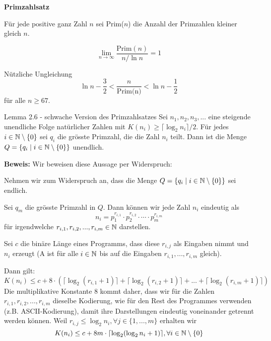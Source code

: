     \textbf{Primzahlsatz}

    Für jede positive ganz Zahl $n$ sei Prim($n$) die Anzahl der Primzahlen kleiner gleich $n$. 
    \begin{mainbox}{}
        $$\lim_{n \to \infty}\frac{\text{Prim}(n)}{n/\ln n} = 1$$
    \end{mainbox}
    Nützliche Ungleichung
    $$\ln n - \frac{3}{2} < \frac{n}{\text{Prim(n)}} < \ln n - \frac{1}{2}$$
    für alle $n \geq 67$.

    \begin{mainbox}{Lemma 2.6 - schwache Version des Primzahlsatzes}
        Sei $n_1, n_2, n_3, ...$ eine steigende unendliche Folge natürlicher Zahlen mit $K(n_i) \geq \lceil \log_2 n_i \rceil / 2$. Für jedes $i \in \mathbb{N} \setminus \{0\}$ sei $q_i$ die grösste Primzahl, die die Zahl $n_i$ teilt. Dann ist die Menge $Q = \{q_i \mid i \in \mathbb{N} \setminus\{0\}\}$ unendlich.
    \end{mainbox}
    \textbf{Beweis: }
    Wir beweisen diese Aussage per Widerspruch:

    Nehmen wir zum Widerspruch an, dass die Menge $Q = \{q_i \mid i \in \mathbb{N} \setminus \{0\}\}$ sei endlich. 
    
    Sei $q_m$ die grösste Primzahl in $Q$. Dann können wir jede Zahl $n_i$ eindeutig als 
    $$n_i = p_1^{r_{i, 1}} \cdot p_2^{r_{i,2}} \cdot \cdots \cdot p_m^{r_{i,m}}$$
    für irgendwelche $r_{i,1}, r_{i,2}, ..., r_{i,m} \in \mathbb{N}$ darstellen. 
    
    
    Sei $c$ die binäre Länge eines Programms, dass diese $r_{i,j}$ als Eingaben nimmt und $n_i$ erzeugt (A ist für alle $i\in \mathbb{N}$ bis auf die Eingaben $r_{i,1}, ..., r_{i,m}$ gleich).
    
    Dann gilt:
    $$K(n_i) \leq c + 8 \cdot (\lceil \log_2(r_{i,1}+1)\rceil + \lceil \log_2(r_{i,2}+1)\rceil + ... + \lceil \log_2(r_{i,m}+1)\rceil)$$
    Die multiplikative Konstante $8$ kommt daher, dass wir für die Zahlen $r_{i,1}, r_{i,2}, ..., r_{i,m}$ dieselbe Kodierung, wie für den Rest des Programmes verwenden (z.B. ASCII-Kodierung), damit ihre Darstellungen eindeutig voneinander getrennt werden können. Weil  $r_{i,j} \leq \log_2 n_i, \forall j \in \{1, ..., m\}$ erhalten wir 
    $$K(n_i) \leq c + 8m \cdot \lceil \log_2(\log_2 n_i + 1)\rceil, \forall i \in \mathbb{N} \setminus \{0\}$$
   
